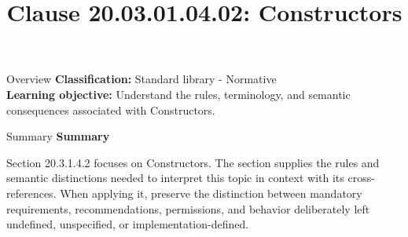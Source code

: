 \documentclass[10pt,letterpaper]{article}
\title{Clause 20.03.01.04.02: Constructors}
\author{}
\date{}
\begin{document}
\maketitle
\begin{CornellOverviewBox}{Overview}
\textbf{Classification:} Standard library - Normative\\[2pt]
\textbf{Learning objective:} Understand the rules, terminology, and semantic consequences associated with Constructors.
\end{CornellOverviewBox}\begin{CornellSummaryBox}{Summary}
{\sffamily\bfseries\color{Accent} Summary}\par\vspace{3pt}Section 20.3.1.4.2 focuses on Constructors. The section supplies the rules and semantic distinctions needed to interpret this topic in context with its cross-references. When applying it, preserve the distinction between mandatory requirements, recommendations, permissions, and behavior deliberately left undefined, unspecified, or implementation-defined.
\end{CornellSummaryBox}
\end{document}
